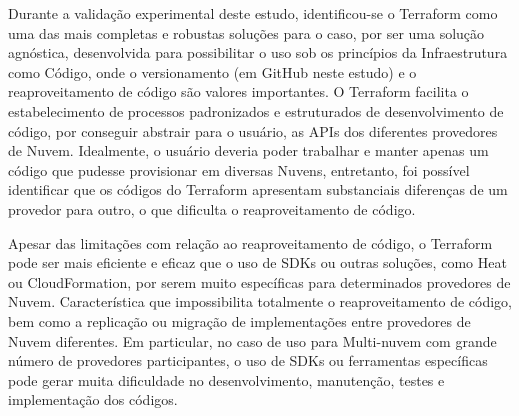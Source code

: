 \documentclass[12pt]{article}
\begin{document}
	Durante a validação experimental deste estudo, identificou-se o Terraform como uma das mais completas e robustas soluções para o caso, por ser uma solução agnóstica, desenvolvida para possibilitar o uso sob os princípios da Infraestrutura como Código, onde o versionamento (em GitHub neste estudo) e o reaproveitamento de código são valores importantes. O Terraform facilita o estabelecimento de processos padronizados e estruturados de desenvolvimento de código, por conseguir abstrair para o usuário, as APIs dos diferentes provedores de Nuvem. Idealmente, o usuário deveria poder trabalhar e manter apenas um código que pudesse provisionar em diversas Nuvens, entretanto, foi possível identificar que os códigos do Terraform apresentam substanciais diferenças de um provedor para outro, o que dificulta o reaproveitamento de código. 
	
	Apesar das limitações com relação ao reaproveitamento de código, o Terraform pode ser mais eficiente e eficaz que o uso de SDKs ou outras soluções, como Heat ou CloudFormation, por serem muito específicas para determinados provedores de Nuvem. Característica que impossibilita totalmente o reaproveitamento de código, bem como a replicação ou migração de implementações entre provedores de Nuvem diferentes. Em particular, no caso de uso para Multi-nuvem com grande número de provedores participantes, o uso de SDKs ou ferramentas específicas pode gerar muita dificuldade no desenvolvimento, manutenção, testes e implementação dos códigos.
	
	
	\nocite{Bond:2015}
	
	\newpage

		
	
	
\end{document}
